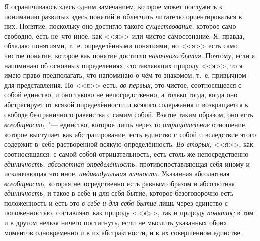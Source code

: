 Я ограничиваюсь здесь одним замечанием, которое может послужить к пониманию
развитых здесь понятий и облегчить читателю ориентироваться в них. Понятие,
поскольку оно достигло такого {\em существования,} которое само свободно,
есть не~что иное, как <<я>> или чистое самосознание. Я, правда, обладаю
понятиями, т.~е. определёнными понятиями, но <<я>> есть само чистое понятие,
которое как понятие достигло {\em наличного бытия}. Поэтому, если я напоминаю
об основных определениях, составляющих природу <<я>>, то я имею право
предполагать, что напоминаю о чём-то знакомом, т.~е. привычном для
представления. Но <<я>> есть, {\em во-первых,} это чистое, соотносящееся с собой
единство, и оно таково не непосредственно, а только тогда, когда оно
абстрагирует от всякой определённости и всякого содержания и возвращается к
свободе безграничного равенства с самим собой. Взятое таким образом, оно
есть {\em всеобщность,} "--- единство, которое лишь через то {\em отрицательное}
отношение, которое выступает как абстрагирование, есть единство с собой и
вследствие этого содержит в~себе растворённой всякую определённость.
{\em Во-вторых,} <<я>>, как соотносящаяся: с самой собой отрицательность, есть
столь же непосредственно {\em единичность, абсолютная определённость,}
противопоставляющая себя иному и исключающая это иное, {\em индивидуальная
личность}. Указанная абсолютная {\em всеобщность,} которая непосредственно есть
равным образом и абсолютная {\em единичность,} и такое в-себе-и-для-себя-бытие,
которое безоговорочно есть положенность и есть это
{\em в-себе-и-для-себя-бытие} лишь через единство с положенностью, составляют
как природу <<я>>, так и природу {\em понятия;} в том и в другом нельзя ничего
постигнуть, если не мыслить указанных обоих моментов одновременно и в их
абстрактности, и в их совершенном единстве.

